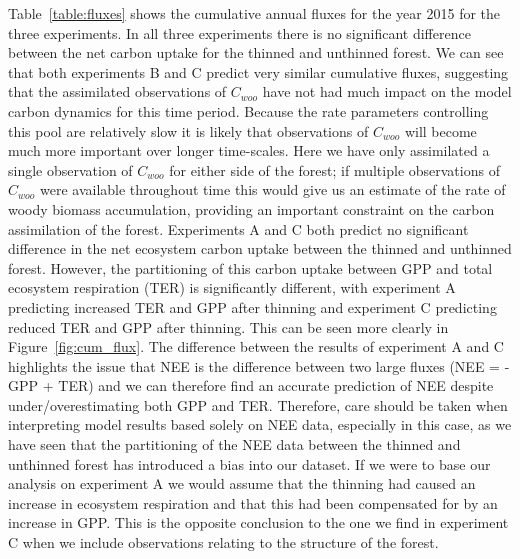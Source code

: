 \documentclass[draft,linenumbers]{agujournal}
\begin{document}
Table~\ref{table:fluxes} shows the cumulative annual fluxes for the year 2015 for the three experiments. In all three experiments there is no significant difference between the net carbon uptake for the thinned and unthinned forest. We can see that both experiments B and C predict very similar cumulative fluxes, suggesting that the assimilated observations of \(C_{woo}\) have not had much impact on the model carbon dynamics for this time period. Because the rate parameters controlling this pool are relatively slow it is likely that observations of \(C_{woo}\) will become much more important over longer time-scales. Here we have only assimilated a single observation of \(C_{woo}\) for either side of the forest; if multiple observations of \(C_{woo}\) were available throughout time this would give us an estimate of the rate of woody biomass accumulation, providing an important constraint on the carbon assimilation of the forest. Experiments A and C both predict no significant difference in the net ecosystem carbon uptake between the thinned and unthinned forest. However, the partitioning of this carbon uptake between GPP and total ecosystem respiration (TER) is significantly different, with experiment A predicting increased TER and GPP after thinning and experiment C predicting reduced TER and GPP after thinning. This can be seen more clearly in Figure~\ref{fig:cum_flux}. The difference between the results of experiment A and C highlights the issue that NEE is the difference between two large fluxes (NEE = -GPP + TER) and we can therefore find an accurate prediction of NEE despite under/overestimating both GPP and TER. Therefore, care should be taken when interpreting model results based solely on NEE data, especially in this case, as we have seen that the partitioning of the NEE data between the thinned and unthinned forest has introduced a bias into our dataset. If we were to base our analysis on experiment A we would assume that the thinning had caused an increase in ecosystem respiration and that this had been compensated for by an increase in GPP. This is the opposite conclusion to the one we find in experiment C when we include observations relating to the structure of the forest. 
\end{document}
